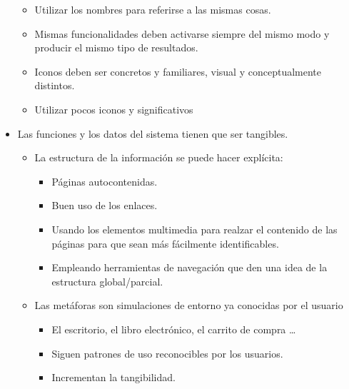 \documentclass[12pt, twoside, openright]{report} %
\begin{document}
\begin{itemize}
\begin{itemize}
		      \item Utilizar los nombres para referirse a las mismas cosas.

		      \item Mismas funcionalidades deben activarse siempre del mismo modo y
		            producir el mismo tipo de resultados.

		      \item Iconos deben ser concretos y familiares, visual y
		            conceptualmente distintos.

		      \item Utilizar pocos iconos y significativos
	      \end{itemize}
	\item Las funciones y los datos del sistema tienen que ser tangibles.

	      \begin{itemize}
		      \item La estructura de la información se puede hacer explícita:

		            \begin{itemize}
			            \item Páginas autocontenidas.

			            \item Buen uso de los enlaces.

			            \item Usando los elementos multimedia para realzar el contenido de
			                  las páginas para que sean más fácilmente identificables.

			            \item Empleando herramientas de navegación que den una idea de la
			                  estructura global/parcial.
		            \end{itemize}

		      \item Las metáforas son simulaciones de entorno ya conocidas por el
		            usuario

		            \begin{itemize}
			            \item El escritorio, el libro electrónico, el carrito de
			                  compra \ldots{}


			            \item Siguen patrones de uso reconocibles por los usuarios.


			            \item Incrementan la tangibilidad.
		            \end{itemize}

	      \end{itemize}
\end{itemize}
\end{document}
